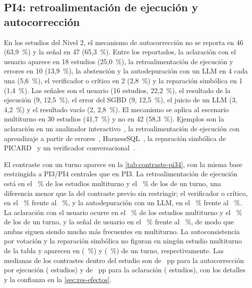 \subsection{PI4: retroalimentación de ejecución y autocorrección}
\label{sec:res-pi4}

En los \nUmbral{} estudios del Nivel 2, el mecanismo de autocorrección no se reporta en 46 (63,9~\%) y la señal en 47 (65,3~\%). Entre los reportados, la aclaración con el usuario aparece en 18 estudios (25,0~\%), la retroalimentación de ejecución y errores en 10 (13,9~\%), la abstención y la autodepuración con un LLM en 4 cada una (5,6~\%), el verificador o crítico en 2 (2,8~\%) y la reparación simbólica en 1 (1,4~\%). Las señales son el usuario (16 estudios, 22,2~\%), el resultado de la ejecución (9, 12,5~\%), el error del SGBD (9, 12,5~\%), el juicio de un LLM (3, 4,2~\%) y el resultado vacío (2, 2,8~\%). El mecanismo se aplica al escenario multiturno en 30 estudios (41,7~\%) y no en 42 (58,3~\%). Ejemplos son la aclaración en un analizador interactivo~\cite{Elgohary2020Speak}, la retroalimentación de ejecución con aprendizaje a partir de errores~\cite{Zhai2024Learn}, HarnessSQL~\cite{Yang2026HarnessSQL}, la reparación simbólica de PICARD~\cite{Scholak2021PICARD} y un verificador conversacional~\cite{HariKrishnanParthasarathi2023Conversational}.

El contraste con un turno aparece en la \cref{tab:contraste-pi34}, con la misma base restringida a PI3/PI4 centrales que en PI3. La retroalimentación de ejecución está en el \ctMecEjecucionFeedbackErroresMT{}~\% de los estudios multiturno y el \ctMecEjecucionFeedbackErroresUT{}~\% de los de un turno, una diferencia menor que la del contraste previo sin restringir; el verificador o crítico, en el \ctMecVerificadorCriticoMT{}~\% frente al \ctMecVerificadorCriticoUT{}~\%, y la autodepuración con un LLM, en el \ctMecAutodepuracionLlmMT{}~\% frente al \ctMecAutodepuracionLlmUT{}~\%. La aclaración con el usuario ocurre en el \ctMecAclaracionUsuarioMT{}~\% de los estudios multiturno y el \ctMecAclaracionUsuarioUT{}~\% de los de un turno, y la señal de usuario en el \ctSenalUsuarioMT{}~\% frente al \ctSenalUsuarioUT{}~\%, de modo que ambas siguen siendo mucho más frecuentes en multiturno. La autoconsistencia por votación y la reparación simbólica no figuran en ningún estudio multiturno de la tabla y aparecen en \nctMecAutoconsistenciaVotacionUT{} (\ctMecAutoconsistenciaVotacionUT{}~\%) y \nctMecReparacionSimbolicaUT{} (\ctMecReparacionSimbolicaUT{}~\%) de un turno, respectivamente. Las medianas de los contrastes dentro del estudio son de \efAutocorrMed{}~pp para la autocorrección por ejecución (\efAutocorrN{} estudios) y de \efAclarMed{}~pp para la aclaración (\efAclarN{} estudios), con los detalles y la confianza en la \cref{sec:res-efectos}.

